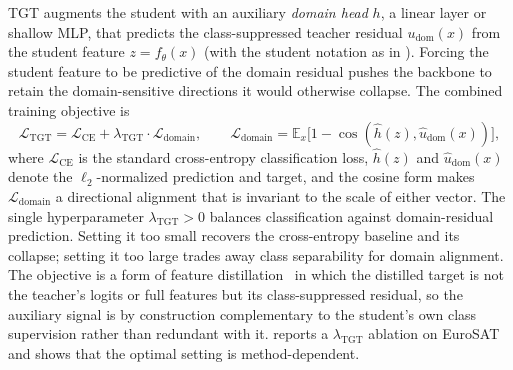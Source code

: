 TGT augments the student with an auxiliary \emph{domain head} $h$, a linear layer or shallow MLP, that predicts the class-suppressed teacher residual $u_{\mathrm{dom}}(x)$ from the student feature $z = f_\theta(x)$ (with the student notation as in ). Forcing the student feature to be predictive of the domain residual pushes the backbone to retain the domain-sensitive directions it would otherwise collapse. The combined training objective is
\begin{equation}
  \mathcal{L}_{\mathrm{TGT}} = \mathcal{L}_{\mathrm{CE}} + \lambda_{\mathrm{TGT}} \cdot \mathcal{L}_{\mathrm{domain}}, \qquad
  \mathcal{L}_{\mathrm{domain}} = \mathbb{E}_x\bigl[1 - \cos(\hat{h}(z), \hat{u}_{\mathrm{dom}}(x))\bigr],
  \label{eq:dsc:tgt}
\end{equation}
where $\mathcal{L}_{\mathrm{CE}}$ is the standard cross-entropy classification loss, $\hat{h}(z)$ and $\hat{u}_{\mathrm{dom}}(x)$ denote the $\ell_2$-normalized prediction and target, and the cosine form makes $\mathcal{L}_{\mathrm{domain}}$ a directional alignment that is invariant to the scale of either vector. The single hyperparameter $\lambda_{\mathrm{TGT}} > 0$ balances classification against domain-residual prediction. Setting it too small recovers the cross-entropy baseline and its collapse; setting it too large trades away class separability for domain alignment. The objective is a form of feature distillation~\citep{hinton2015distilling} in which the distilled target is not the teacher's logits or full features but its class-suppressed residual, so the auxiliary signal is by construction complementary to the student's own class supervision rather than redundant with it.  reports a $\lambda_{\mathrm{TGT}}$ ablation on EuroSAT and shows that the optimal setting is method-dependent.

